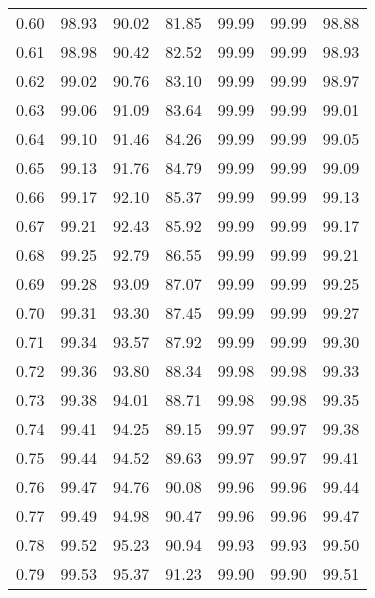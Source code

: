 \begin{tabular}{|c|c|c|c|c|c|c|}
      0.60 &     98.93 &     90.02 &      81.85 &   99.99 &      99.99 &         98.88 \\
      0.61 &     98.98 &     90.42 &      82.52 &   99.99 &      99.99 &         98.93 \\
      0.62 &     99.02 &     90.76 &      83.10 &   99.99 &      99.99 &         98.97 \\
      0.63 &     99.06 &     91.09 &      83.64 &   99.99 &      99.99 &         99.01 \\
      0.64 &     99.10 &     91.46 &      84.26 &   99.99 &      99.99 &         99.05 \\
      0.65 &     99.13 &     91.76 &      84.79 &   99.99 &      99.99 &         99.09 \\
      0.66 &     99.17 &     92.10 &      85.37 &   99.99 &      99.99 &         99.13 \\
      0.67 &     99.21 &     92.43 &      85.92 &   99.99 &      99.99 &         99.17 \\
      0.68 &     99.25 &     92.79 &      86.55 &   99.99 &      99.99 &         99.21 \\
      0.69 &     99.28 &     93.09 &      87.07 &   99.99 &      99.99 &         99.25 \\
      0.70 &     99.31 &     93.30 &      87.45 &   99.99 &      99.99 &         99.27 \\
      0.71 &     99.34 &     93.57 &      87.92 &   99.99 &      99.99 &         99.30 \\
      0.72 &     99.36 &     93.80 &      88.34 &   99.98 &      99.98 &         99.33 \\
      0.73 &     99.38 &     94.01 &      88.71 &   99.98 &      99.98 &         99.35 \\
      0.74 &     99.41 &     94.25 &      89.15 &   99.97 &      99.97 &         99.38 \\
      0.75 &     99.44 &     94.52 &      89.63 &   99.97 &      99.97 &         99.41 \\
      0.76 &     99.47 &     94.76 &      90.08 &   99.96 &      99.96 &         99.44 \\
      0.77 &     99.49 &     94.98 &      90.47 &   99.96 &      99.96 &         99.47 \\
      0.78 &     99.52 &     95.23 &      90.94 &   99.93 &      99.93 &         99.50 \\
      0.79 &     99.53 &     95.37 &      91.23 &   99.90 &      99.90 &         99.51 \\

\end{tabular}
